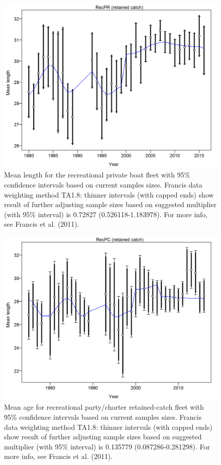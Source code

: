 \documentclass[12pt,]{article}
\begin{document}
\begin{figure}[htbp]
\centering
\includegraphics{r4ss/plots_mod1/comp_lenfit_data_weighting_TA1.8_RecPR.png}
\caption{Mean length for the recreational private boat fleet with 95\%
confidence intervals based on current samples sizes. Francis data
weighting method TA1.8: thinner intervals (with capped ends) show result
of further adjusting sample sizes based on suggested multiplier (with
95\% interval) is 0.72827 (0.526118-1.183978). For more info, see
Francis et al. (2011).
\label{fig:comp_lenfit_data_weighting_TA1.8_RecPR}}
\end{figure}

\begin{figure}[htbp]
\centering
\includegraphics{r4ss/plots_mod1/comp_lenfit_data_weighting_TA1.8_RecPC.png}
\caption{Mean age for recreational party/charter retained-catch fleet
with 95\% confidence intervals based on current samples sizes. Francis
data weighting method TA1.8: thinner intervals (with capped ends) show
result of further adjusting sample sizes based on suggested multiplier
(with 95\% interval) is 0.135779 (0.087286-0.281298). For more info, see
Francis et al.
(2011).\label{fig:comp_lenfit_data_weighting_TA1.8_RecPC}}
\end{figure}
\end{document}
